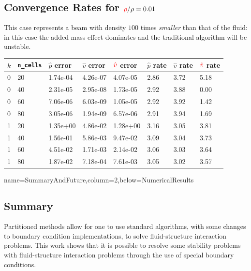 \documentclass[
paperwidth=48in,paperheight=36in,
fontscale=0.4
]{baposter}
\begin{document}
\begin{poster}
{\subsection{Convergence Rates for \({\color{red} \bar{\rho}}/\rho = 0.01\)}
    This case represents a beam with density \(100\) times \emph{smaller} than that
    of the fluid: in this case the added-mass effect dominates and the
    traditional algorithm will be unstable.
    \begin{center}
        \begin{tabular}{| l | l | l | l | l | l | l | l |}
            \hline
            \(k\) & \texttt{n\_cells} &
            \(\hat{p}\) error & \(\hat{v}\) error & \({\color{red} \hat{v}}\) error &
            \(\hat{p}\) rate & \(\hat{v}\) rate & \({\color{red} \hat{v}}\) rate    \\
            \hline
            0 & 20 & 1.74e-04 & 4.26e-07 & 4.07e-05 & 2.86 & 3.72 & 5.18      \\
            0 & 40 & 2.31e-05 & 2.95e-08 & 1.73e-05 & 2.92 & 3.88 & 0.00      \\
            0 & 60 & 7.06e-06 & 6.03e-09 & 1.05e-05 & 2.92 & 3.92 & 1.42      \\
            0 & 80 & 3.05e-06 & 1.94e-09 & 6.57e-06 & 2.91 & 3.94 & 1.69      \\
            \hline
            1 & 20 & 1.35e+00 & 4.86e-02 & 1.28e+00 & 3.16 & 3.05 & 3.81      \\
            1 & 40 & 1.56e-01 & 5.86e-03 & 9.47e-02 & 3.09 & 3.04 & 3.73      \\
            1 & 60 & 4.51e-02 & 1.71e-03 & 2.14e-02 & 3.06 & 3.03 & 3.64      \\
            1 & 80 & 1.87e-02 & 7.18e-04 & 7.61e-03 & 3.05 & 3.02 & 3.57      \\
            \hline
        \end{tabular}
    \end{center}

\phantom{A}
}

          {name=SummaryAndFuture,column=2,below=NumericalResults}
{
\subsection{Summary}
    Partitioned methods allow for one to use standard algorithms, with some
    changes to boundary condition implementations, to solve fluid-structure
    interaction problems. This work shows that it is possible to resolve some
    stability problems with fluid-structure interaction problems through the use
    of special boundary conditions.

}
\end{poster}
\end{document}
